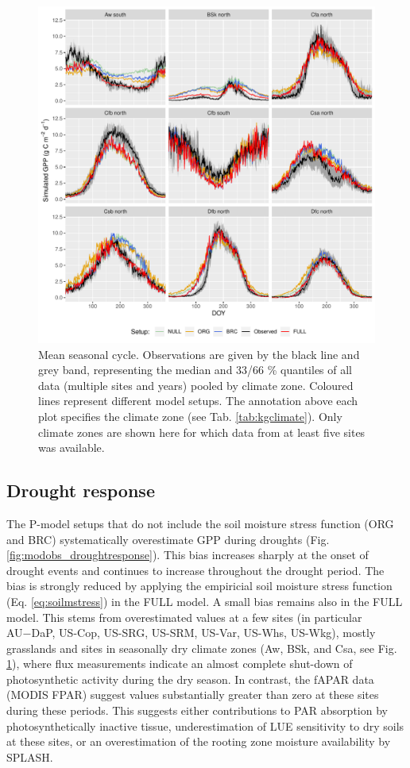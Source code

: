 \documentclass{myreport}
\begin{document}
 \begin{figure}[!ht]
\includegraphics[width=\textwidth]{fig/meandoy_byzone.pdf}
\caption{Mean seasonal cycle. Observations are given by the black line and grey band, representing the median and 33/66 \% quantiles of all data (multiple sites and years) pooled by climate zone. Coloured lines represent different model setups. The annotation above each plot specifies the climate zone (see Tab. \ref{tab:kgclimate}). Only climate zones are shown here for which data from at least five sites was available.}
    \label{fig:season}
\end{figure}


\subsection{Drought response}
\label{sec:results_droughtresponse}

The P-model setups that do not include the soil moisture stress function (ORG and BRC) systematically overestimate GPP during droughts (Fig. \ref{fig:modobs_droughtresponse}). This bias increases sharply at the onset of drought events and continues to increase throughout the drought period. The bias is strongly reduced by applying the empiricial soil moisture stress function (Eq. \ref{eq:soilmstress}) in the FULL model. A small bias remains also in the FULL model. This stems from overestimated values at a few sites (in particular AU−DaP, US-Cop, US-SRG, US-SRM, US-Var, US-Whs, US-Wkg), mostly grasslands and sites in seasonally dry climate zones (Aw, BSk, and Csa, see Fig. \ref{fig:season}), where flux measurements indicate an almost complete shut-down of photosynthetic activity during the dry season. In contrast, the fAPAR data (MODIS FPAR) suggest values substantially greater than zero at these sites during these periods. This suggests either contributions to PAR absorption by photosynthetically inactive tissue, underestimation of LUE sensitivity to dry soils at these sites, or an overestimation of the rooting zone moisture availability by SPLASH.
\end{document}

